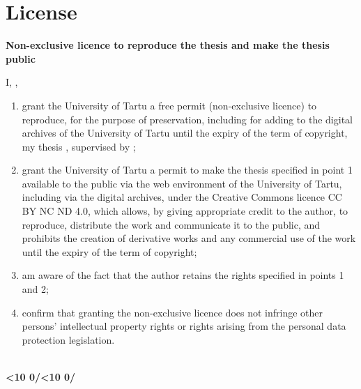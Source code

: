 \section*{License} \label{sec:license} 

\newcommand{\licenseTwoDigits}[1]{\ifnum#1<10 0\fi\number#1}
\newcommand{\licenseDate}{\licenseTwoDigits{\day}/\licenseTwoDigits{\month}/\number\year}

\begingroup
\linespread{1.0}\selectfont
\setlength{\parindent}{0pt}
\setlength{\parskip}{0pt}

\vspace{12pt}

\textbf{Non-exclusive licence to reproduce the thesis and make the thesis public}

\vspace{12pt}

I, \thesisAuthor,

\vspace{12pt}

\begin{enumerate}
  \setlength{\itemsep}{12pt}
  \setlength{\parsep}{0pt}
  \setlength{\topsep}{0pt}

  \item grant the University of Tartu a free permit (non-exclusive licence) to reproduce, for the purpose of preservation, including for adding to the digital archives of the University of Tartu until the expiry of the term of copyright, my thesis \textbf{\thesisTitle}, supervised by \textbf{\thesisSupervisor};

  \item grant the University of Tartu a permit to make the thesis specified in point 1 available to the public via the web environment of the University of Tartu, including via the digital archives, under the Creative Commons licence CC BY NC ND 4.0, which allows, by giving appropriate credit to the author, to reproduce, distribute the work and communicate it to the public, and prohibits the creation of derivative works and any commercial use of the work until the expiry of the term of copyright;

  \item am aware of the fact that the author retains the rights specified in points 1 and 2;

  \item confirm that granting the non-exclusive licence does not infringe other persons' intellectual property rights or rights arising from the personal data protection legislation.
\end{enumerate}

\vspace{12pt}

\thesisAuthor\\
\textbf{\licenseDate}

\endgroup
